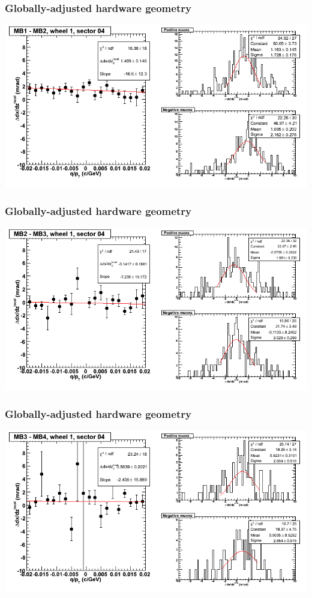 \documentclass[compress]{beamer}
\begin{document}
\begin{frame}
\frametitle{Globally-adjusted hardware geometry}
\includegraphics[width=\linewidth]{NOV4_segdiffs_HW/dt13_slope_D_04_12.png}
\end{frame}

\begin{frame}
\frametitle{Globally-adjusted hardware geometry}
\includegraphics[width=\linewidth]{NOV4_segdiffs_HW/dt13_slope_D_04_23.png}
\end{frame}

\begin{frame}
\frametitle{Globally-adjusted hardware geometry}
\includegraphics[width=\linewidth]{NOV4_segdiffs_HW/dt13_slope_D_04_34.png}
\end{frame}
\end{document}
